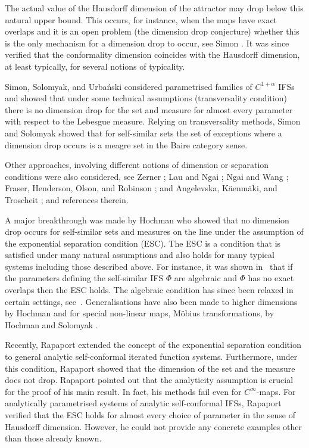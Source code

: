\documentclass[11pt,a4paper]{article}
\theoremstyle{definition}
\theoremstyle{remark}
\newcommand{\0}{\mathbf{0}}
\numberwithin{equation}{section}
\begin{document}
The actual value of the Hausdorff dimension of the attractor may drop below this natural upper
bound. This occurs, for instance, when the maps have exact overlaps and it is an open problem (the
dimension drop conjecture) whether this is the only mechanism for a dimension drop to occur, see
Simon \cite{Simon1996}.  It was since verified that the conformality dimension coincides with the
Hausdorff dimension, at least typically, for several notions of typicality.

Simon, Solomyak, and Urba\'nski \cite{SimonSolomyakUrbanski2,SimonSolomyakUrbanski1} considered
parametrised families of $C^{1+\alpha}$ IFSs and showed that under some technical assumptions
(transversality condition) there is no dimension drop for the set and measure for almost every
parameter with respect to the Lebesgue measure. Relying on transversality methods, Simon and
Solomyak \cite{SimonSolomyak02} showed that for self-similar sets the set of exceptions where a
dimension drop occurs is a meagre set in the Baire category sense. 

Other approaches, involving different notions of dimension or separation conditions were also
considered, see
Zerner \cite{Zerner1996}; Lau and Ngai \cite{LauNgai1999}; Ngai and Wang \cite{NgaiWang2001}; Fraser,
Henderson, Olson, and Robinson \cite{FHOR2015}; and Angelevska, K\"aenm\"aki, and Troscheit
\cite{AngelevskaKaenmakiTroscheit2020}; and references therein.

A major breakthrough was made by Hochman \cite{Hochman_SelfSimESC_Annals} who showed that no
dimension drop occurs for self-similar sets and measures on the line under the
assumption of the exponential separation condition (ESC).
The ESC is a condition that is satisfied under many natural assumptions and also holds for many typical
systems including those described above. 
For instance, it was shown in~\cite{Hochman_SelfSimESC_Annals}
that if the parameters defining the self-similar IFS $\Phi$ are algebraic and $\Phi$ has no exact
overlaps then the ESC holds. The algebraic condition has since been relaxed in certain settings,
see~\cite{FengFeng_DimHomoIFSAlgebraicTrans, Rapaport_ExactOverlapsAlgebraicContr,
RapaportVarju_Duke24, Varju_BernConv_Annals19}.
Generalisations have also been made to higher dimensions by Hochman \cite{Hochman2017} and for
special non-linear maps, M\"obius transformations, by Hochman and Solomyak
\cite{HochmanSolomyak_Invent17}.


Recently, Rapaport \cite{Rapaport_SelfConfESC25arXiv} extended the concept of the exponential
separation condition to general
analytic self-conformal iterated function systems. Furthermore, under this condition, Rapaport
showed that the dimension of the set and the measure does not drop.
Rapaport pointed out that the analyticity assumption is crucial for the proof of his main result.
In fact, his methods fail even for $C^\infty$-maps.
For analytically parametrised systems of analytic self-conformal IFSs, Rapaport verified that the
ESC holds for almost every choice of parameter in the sense of Hausdorff dimension.
However, he could not provide any concrete examples other than those already known.
\end{document}
